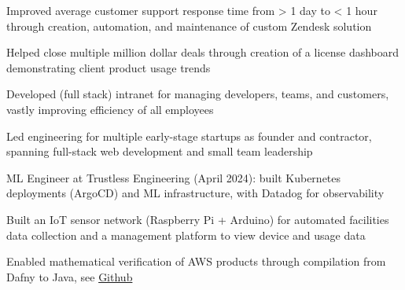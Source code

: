 \documentclass[print]{jack-resume}
\begin{document}
\begin{tightemize}
    \item Improved average customer support response time from > 1 day to < 1 hour through creation, automation, and maintenance of custom Zendesk solution
    \item Helped close multiple million dollar deals through creation of a license dashboard demonstrating client product usage trends
    \item Developed (full stack) intranet for managing developers, teams, and customers, vastly improving efficiency of all employees
\end{tightemize}
\sectionsep

\begin{tightemize}
    \item Led engineering for multiple early-stage startups as founder and contractor, spanning full-stack web development and small team leadership
    \item ML Engineer at Trustless Engineering (April 2024): built Kubernetes deployments (ArgoCD) and ML infrastructure, with Datadog for observability
\end{tightemize}
\sectionsep

\begin{tightemize}
    \item Built an IoT sensor network (Raspberry Pi + Arduino) for automated facilities data collection and a management platform to view device and usage data
\end{tightemize}

\begin{tightemize}
    \item Enabled mathematical verification of AWS products through compilation from Dafny to Java, see \href{https://github.com/dafny-lang/dafny}{Github \ExternalLink}
\end{tightemize}
\sectionsep
\end{document}
